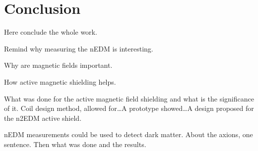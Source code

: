 
\begingroup

\let\clearpage\relax
\let\cleardoublepage\relax
\let\cleardoublepage\relax

\chapter*{Conclusion} %
Here conclude the whole work.

Remind why measuring the nEDM is interesting.

Why are magnetic fields important.

How active magnetic shielding helps. 

What was done for the active magnetic field shielding and what is the significance of it. Coil design method, allowed for\ldots A prototype showed\ldots A design proposed for the n2EDM active shield.

nEDM measurements could be used to detect dark matter. About the axions, one sentence. Then what was done and the results.

\endgroup